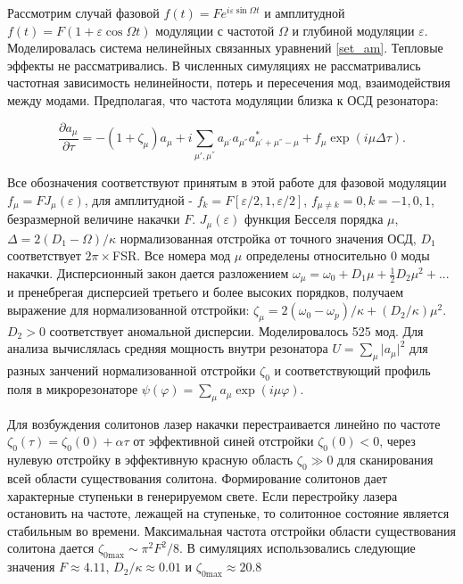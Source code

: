 Рассмотрим случай \cite{Lobanov2016} фазовой $f(t)=F e^{i\varepsilon\sin\Omega t}$ и амплитудной $f(t)=F(1+\varepsilon\cos\Omega t)$  модуляции с частотой $\Omega$ и глубиной модуляции $\varepsilon$. Моделировалась система нелинейных связанных уравнений \ref{set_am}. Тепловые эффекты не рассматривались. В численных симуляциях не рассматривались частотная зависимость нелинейности, потерь и пересечения мод, взаимодействия между модами. Предполагая, что частота модуляции близка к ОСД резонатора:

\begin{equation}
\frac{\partial a_\mu}{\partial \tau}=-(1+\zeta_\mu)a_\mu+i\sum_{\mu',\mu^{''}}a_{\mu^{'}} a_{\mu^{''}} a^{*}_{\mu^{'}+\mu^{''}-\mu}+f_{\mu}\exp(i\mu\Delta\tau).
\end{equation}

Все обозначения соответствуют принятым в этой работе для фазовой модуляции $f_\mu=F J_\mu(\varepsilon)$, для амплитудной - $f_{k}=F[\varepsilon/2,1,\varepsilon/2]$,  $f_{\mu \neq k}=0, k={-1,0,1}$, безразмерной величине накачки $F$. $J_\mu(\varepsilon)$ функция Бесселя порядка $\mu$, $\Delta=2(D_1-\Omega)/\kappa$ нормализованная отстройка от точного значения ОСД, $D_1$ соответствует $2\pi\times$FSR. Все номера мод $\mu$ определены относительно 0 моды накачки. Дисперсионный закон дается разложением $\omega_\mu=\omega_0+D_1\mu+\frac{1}{2}D_2\mu^2+...$ и пренебрегая дисперсией третьего и более высоких порядков, получаем выражение для нормализованной отстройки: $\zeta_\mu=2(\omega_0-\omega_p)/\kappa+(D_2/\kappa)\mu^2$. $D_2>0$ соответствует аномальной дисперсии. Моделировалось 525 мод. Для анализа вычислялась средняя мощность внутри резонатора $U=\sum_{\mu} \vert a_\mu\vert^2$ для разных занчений нормализованной отстройки $\zeta_0$ и соответствующий профиль поля в микрорезонаторе $\psi(\varphi)=\sum_{\mu} a_{\mu}\exp(i\mu\varphi)$.

Для возбуждения солитонов лазер накачки перестраивается линейно по частоте $\zeta_{0}(\tau)=\zeta_{0}(0)+\alpha\tau$ от эффективной синей отстройки $\zeta_0(0)<0$, через нулевую отстройку в эффективную красную область $\zeta_0\gg0$ для сканирования всей области существования солитона. Формирование солитонов дает характерные ступеньки в генерируемом свете. Если перестройку лазера остановить на частоте, лежащей на ступеньке, то солитонное состояние является стабильным во времени. Максимальная частота отстройки области существования солитона \cite{Herr2014} дается $\zeta_{0\text{max}}\sim {\pi^2 F^2}/{8}$. В симуляциях использовались следующие значения $F\approx 4.11$, $D_{2}/\kappa\approx {0.01}$ и $\zeta_{0\text{max}}\approx 20.8$

